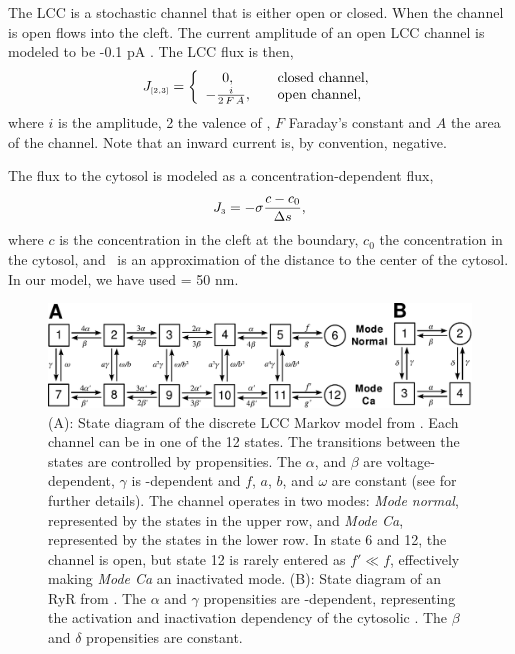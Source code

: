The LCC is a stochastic channel that is either open or closed. When
the channel is open \Ca flows into the cleft. The current amplitude
of an open LCC channel is modeled to be -0.1 pA
\citep{GuiaSternLakattaEtAl2001}. The LCC flux is then,
\begin{equation}
\label{eq:hake:constant-current-flux}
J_{\scriptscriptstyle[2,3]}= \left\{
  \begin{array}{c@{\quad\quad}l}
    0,& \text{closed channel},\\
    - \frac{i}{2\,F\,A},& \text{open channel},
  \end{array}
\right.
\end{equation}
\noindent where $i$ is the amplitude, 2 the valence of \Ca, $F$
Faraday's constant and $A$ the area of the channel. Note that an
inward current is, by convention, negative.

The flux to the cytosol is modeled as a concentration-dependent flux,
\begin{equation}
  \label{eq:hake:conc-dependent-flux}
  J_{\scriptscriptstyle 3}= -\sigma\frac{c - c_0}{\Delta{}s},
\end{equation}
where $c$ is the concentration in the cleft at the boundary, $c_0$ the
concentration in the cytosol, and \Ds~is an approximation of the
distance to the center of the cytosol. In our model, we have used \Ds
= 50 nm.

\begin{figure}
  \center
  \includegraphics[height=\largefig]{chapters/hake/pdf/markov_models}
  \caption[Discrete markov models]{(A): State diagram of the
    discrete LCC Markov model from \citet{JafriRiceWinslow1998}. Each
    channel can be in one of the 12 states.  The transitions between
    the states are controlled by propensities. The $\alpha$, and
    $\beta$ are voltage-dependent, $\gamma$ is \CaC-dependent and $f$,
    $a$, $b$, and $\omega$ are constant (see
    \citet{JafriRiceWinslow1998} for further details). The channel
    operates in two modes: \textit{Mode normal}, represented by the
    states in the upper row, and \textit{Mode Ca}, represented by the
    states in the lower row. In state 6 and 12, the channel is open,
    but state 12 is rarely entered as $f'\ll{}f$, effectively making
    \textit{Mode Ca} an inactivated mode. (B): State diagram
    of an RyR from \citet{SternSongEtAl1999}. The $\alpha$ and
    $\gamma$ propensities are \Ca-dependent, representing the
    activation and inactivation dependency of the cytosolic \CaC. The
    $\beta$ and $\delta$ propensities are constant.}
  \label{fig:hake:markov-models}
\end{figure}

